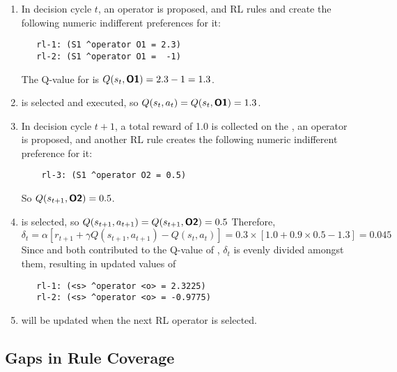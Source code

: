 \begin{enumerate}

\item In decision cycle $t$, an operator  is proposed, and RL rules  and  create the following numeric indifferent preferences for it:
\begin{verbatim}
   rl-1: (S1 ^operator O1 = 2.3)
   rl-2: (S1 ^operator O1 =  -1)
\end{verbatim}  
	The Q-value for  is $Q(s_t, \textsf{\textbf{O1}}) = 2.3 - 1 = 1.3$.
	 
\item {} is selected and executed, so $Q(s_t, a_t) = Q(s_t, \textsf{\textbf{O1}}) = 1.3$.

\item In decision cycle $t+1$, a total reward of 1.0 is collected on the , an operator  is proposed, and another RL rule  creates the following numeric indifferent preference for it:
\begin{verbatim}
	rl-3: (S1 ^operator O2 = 0.5)
\end{verbatim}
	So $Q(s_{t+1}, \textsf{\textbf{O2}}) = 0.5$.

\item {} is selected, so $Q(s_{t+1}, a_{t+1}) = Q(s_{t+1}, \textsf{\textbf{O2}}) = 0.5$
	Therefore, 
	$$\delta_t = \alpha \left[r_{t+1} + \gamma Q(s_{t+1}, a_{t+1}) - Q(s_t, a_t) \right] = 0.3 \times [ 1.0 + 0.9 \times 0.5 - 1.3 ] = 0.045$$
	Since  and  both contributed to the Q-value of , $\delta_t$ is evenly divided amongst them, resulting in updated values of
\begin{verbatim}
   rl-1: (<s> ^operator <o> = 2.3225)
   rl-2: (<s> ^operator <o> = -0.9775)
\end{verbatim}

\item {} will be updated when the next RL operator is selected.
\end{enumerate}

\subsection{Gaps in Rule Coverage}
\label{RL-gaps}

